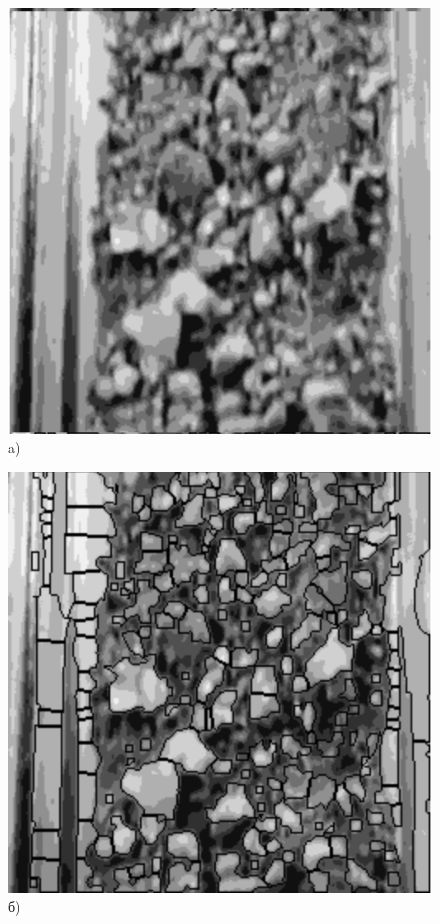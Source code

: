 \documentclass[times]{itmo-student-thesis}
\begin{document}
\begin{figure}[h!]
	\begin{minipage}[h]{0.3\linewidth}
		\centering
		\includegraphics[width=\linewidth]{images/clear} \\ a)
	\end{minipage}
	\hfill
	\begin{minipage}[h]{0.3\linewidth}
		\centering
		\includegraphics[width=\linewidth]{images/watersher} \\ б)

\end{minipage}
\end{figure}
\end{document}
